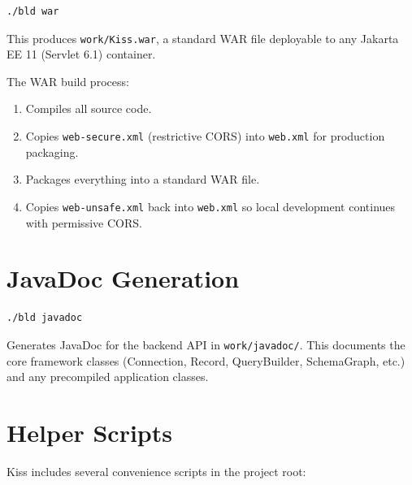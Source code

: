 \begin{lstlisting}[style=shell]
./bld war
\end{lstlisting}

\noindent
This produces \texttt{work/Kiss.war}, a standard WAR file deployable to any Jakarta EE 11 (Servlet 6.1) container.

The WAR build process:

\begin{enumerate}
  \item Compiles all source code.
  \item Copies \texttt{web-secure.xml} (restrictive CORS) into \texttt{web.xml} for production packaging.
  \item Packages everything into a standard WAR file.
  \item Copies \texttt{web-unsafe.xml} back into \texttt{web.xml} so local development continues with permissive CORS.
\end{enumerate}

\section{JavaDoc Generation}
\label{sec:build-javadoc}

\begin{lstlisting}[style=shell]
./bld javadoc
\end{lstlisting}

\noindent
Generates JavaDoc for the backend API in \texttt{work/javadoc/}.  This documents the core framework classes (Connection, Record, QueryBuilder, SchemaGraph, etc.) and any precompiled application classes.

\section{Helper Scripts}
\label{sec:build-helpers}

Kiss includes several convenience scripts in the project root:

